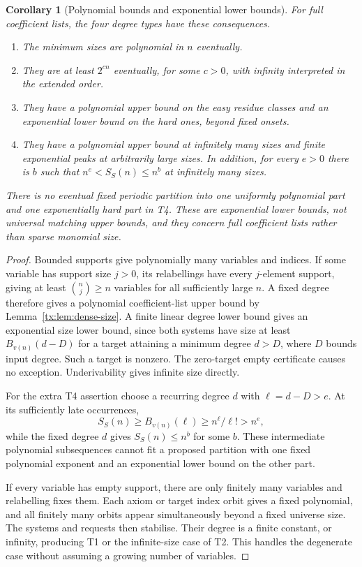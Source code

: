 \documentclass[11pt,a4paper,oneside,openany]{book}
\newtheorem{corollary}[theorem]{Corollary}
\theoremstyle{definition}\newtheorem{definition}[theorem]{Definition}
\theoremstyle{remark}\newtheorem{remark}[theorem]{Remark}
\numberwithin{equation}{chapter}
\begin{document}
\begin{corollary}[Polynomial bounds and exponential lower bounds]\label{tx:cor:dense-types}
For full coefficient lists, the four degree types have these consequences.
\begin{enumerate}[label=\textup{T\arabic*.}]
\item The minimum sizes are polynomial in $n$ eventually.
\item They are at least $2^{cn}$ eventually, for some $c>0$, with
infinity interpreted in the extended order.
\item They have a polynomial upper bound on the easy residue classes
and an exponential lower bound on the hard ones, beyond fixed onsets.
\item They have a polynomial upper bound at infinitely many sizes and
finite exponential peaks at arbitrarily large sizes. In addition, for
every $e>0$ there is $b$ such that $n^e<S_S(n)\le n^b$ at infinitely
many sizes.
\end{enumerate}
There is no eventual fixed periodic partition into one uniformly
polynomial part and one exponentially hard part in T4. These are
exponential lower bounds, not universal matching upper bounds, and they
concern full coefficient lists rather than sparse monomial size.
\end{corollary}
\begin{proof}
Bounded supports give polynomially many variables and indices. If some
variable has support size $j>0$, its relabellings have every $j$-element
support, giving at least $\binom nj\ge n$ variables for all sufficiently
large $n$. A fixed degree therefore gives a polynomial coefficient-list
upper bound by Lemma~\ref{tx:lem:dense-size}. A finite linear degree
lower bound gives an exponential size lower bound, since both systems
have size at least $B_{v(n)}(d-D)$ for a target attaining a minimum
degree $d>D$, where $D$ bounds input degree. Such a target is nonzero.
The zero-target empty certificate causes no exception. Underivability
gives infinite size directly.

For the extra T4 assertion choose a recurring degree $d$ with
$\ell=d-D>e$. At its sufficiently late occurrences,
\[
                 S_S(n)\ge B_{v(n)}(\ell)
                         \ge n^\ell/\ell!>n^e,
\]
while the fixed degree $d$ gives $S_S(n)\le n^b$ for some $b$.
These intermediate polynomial subsequences cannot fit a proposed
partition with one fixed polynomial exponent and an exponential lower
bound on the other part.

If every variable has empty support, there are only finitely many
variables and relabelling fixes them. Each axiom or target index orbit
gives a fixed polynomial, and all finitely many orbits appear
simultaneously beyond a fixed universe size. The systems and requests then
stabilise. Their degree is a finite constant, or infinity, producing
T1 or the infinite-size case of T2. This handles the degenerate case
without assuming a growing number of variables.
\end{proof}
\end{document}
